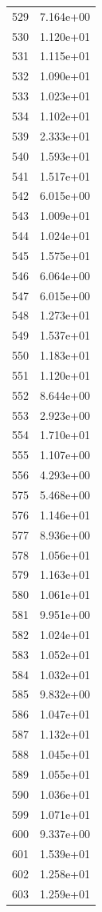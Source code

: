 \documentclass[12pt]{article}
\begin{document}
\begin{longtable}{@{}cc@{}}
529 & 7.164e+00 \\
530 & 1.120e+01 \\
531 & 1.115e+01 \\
532 & 1.090e+01 \\
533 & 1.023e+01 \\
534 & 1.102e+01 \\
539 & 2.333e+01 \\
540 & 1.593e+01 \\
541 & 1.517e+01 \\
542 & 6.015e+00 \\
543 & 1.009e+01 \\
544 & 1.024e+01 \\
545 & 1.575e+01 \\
546 & 6.064e+00 \\
547 & 6.015e+00 \\
548 & 1.273e+01 \\
549 & 1.537e+01 \\
550 & 1.183e+01 \\
551 & 1.120e+01 \\
552 & 8.644e+00 \\
553 & 2.923e+00 \\
554 & 1.710e+01 \\
555 & 1.107e+00 \\
556 & 4.293e+00 \\
575 & 5.468e+00 \\
576 & 1.146e+01 \\
577 & 8.936e+00 \\
578 & 1.056e+01 \\
579 & 1.163e+01 \\
580 & 1.061e+01 \\
581 & 9.951e+00 \\
582 & 1.024e+01 \\
583 & 1.052e+01 \\
584 & 1.032e+01 \\
585 & 9.832e+00 \\
586 & 1.047e+01 \\
587 & 1.132e+01 \\
588 & 1.045e+01 \\
589 & 1.055e+01 \\
590 & 1.036e+01 \\
599 & 1.071e+01 \\
600 & 9.337e+00 \\
601 & 1.539e+01 \\
602 & 1.258e+01 \\
603 & 1.259e+01 \\

\end{longtable}
\end{document}
